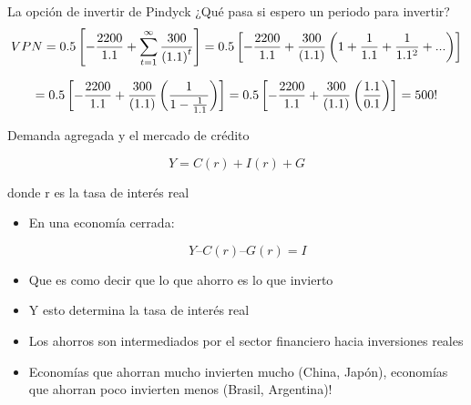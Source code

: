\documentclass{beamer}
\begin{document}
\begin{frame}{La opción de invertir de Pindyck}
¿Qué pasa si espero un periodo para invertir?
\scriptsize
\begin{equation}
VPN=0.5\left[ -\frac{2200}{1.1}+\sum\limits_{t=1}^{\infty }\frac{300}{%
\left( 1.1\right) ^{t}}\right] =0.5\left[ -\frac{2200}{1.1}+\frac{300}{%
\left( 1.1\right) }\left( 1+\frac{1}{1.1}+\frac{1}{1.1^{2}}+ ... \right) %
\right]
\end{equation}

\begin{equation}
=0.5\left[ -\frac{2200}{1.1}+\frac{300}{\left( 1.1\right) }\left( \frac{1%
}{1-\frac{1}{1.1}}\right) \right] =0.5\left[ -\frac{2200}{1.1}+\frac{300}{%
\left( 1.1\right) }\left( \frac{1.1}{0.1}\right) \right] = 500!
\end{equation}
\end{frame}

\begin{frame}{Demanda agregada y el mercado de crédito}

    \begin{itemize}
\begin{tcolorbox}[width=4in,
                  interior hidden,
                  boxsep=0pt,
                  left=0pt,
                  right=0pt,
                  top=2pt,
                  ]%
$$ Y = C(r) + I(r) + G $$
\end{tcolorbox}
    \end{itemize}
    
\centering \small{donde r es la tasa de interés real}

 \begin{itemize}
        \item En una economía cerrada:
        
        \begin{tcolorbox}[width=4in,
                  interior hidden,
                  boxsep=0pt,
                  left=0pt,
                  right=0pt,
                  top=2pt,
                  ]%
                    $$ Y – C(r) – G(r) = I $$
        \end{tcolorbox}
        
    \end{itemize}
    \begin{itemize}
        \item Que es como decir que lo que ahorro es lo que invierto
        \item Y esto determina la tasa de interés real
        \item Los ahorros son intermediados por el sector financiero hacia inversiones reales
        \item Economías que ahorran mucho invierten mucho (China, Japón), economías que ahorran poco invierten menos (Brasil, Argentina)! 
    \end{itemize}
 \end{frame}
\end{document}
